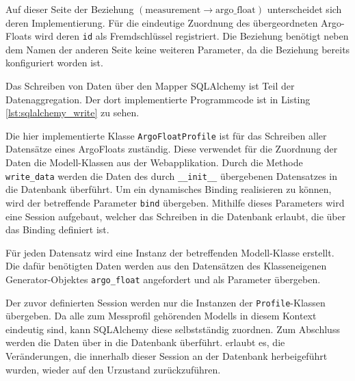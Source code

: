 
Auf dieser Seite der Beziehung   $\left( \mbox{measurement} \to \mbox{argo\_float} \right)$ unterscheidet sich deren Implementierung. Für die eindeutige Zuordnung des übergeordneten Argo-Floats wird deren \texttt{id} als Fremdschlüssel registriert. Die Beziehung benötigt neben dem Namen der anderen Seite keine weiteren Parameter, da die Beziehung bereits konfiguriert worden ist.




Das Schreiben von Daten über den Mapper SQLAlchemy ist Teil der Datenaggregation. Der dort implementierte Programmcode ist in Listing \ref{lst:sqlalchemy_write} zu sehen.




Die hier implementierte Klasse \texttt{ArgoFloatProfile} ist für das Schreiben aller Datensätze eines ArgoFloats zuständig. Diese verwendet für die Zuordnung der Daten die Modell-Klassen aus der Webapplikation. Durch die Methode \texttt{write\_data} werden die Daten des durch \texttt{\_\_init\_\_} übergebenen Datensatzes in die Datenbank überführt.
Um ein dynamisches Binding realisieren zu können, wird der betreffende Parameter \texttt{bind} übergeben. Mithilfe dieses Parameters wird eine Session aufgebaut, welcher das Schreiben in die Datenbank erlaubt, die über das Binding definiert ist.

Für jeden Datensatz wird eine Instanz der betreffenden Modell-Klasse erstellt. Die dafür benötigten Daten werden aus den Datensätzen des Klasseneigenen Generator-Objektes \texttt{argo\_float} angefordert und als Parameter übergeben.

Der zuvor definierten Session werden nur die Instanzen der \texttt{Profile}-Klassen übergeben. Da alle zum Messprofil gehörenden Modells in diesem Kontext eindeutig sind, kann SQLAlchemy diese selbstständig zuordnen.
Zum Abschluss werden die Daten über  in die Datenbank überführt.
 erlaubt es, die Veränderungen, die innerhalb dieser Session an der Datenbank herbeigeführt wurden, wieder auf den Urzustand zurückzuführen.  \\

